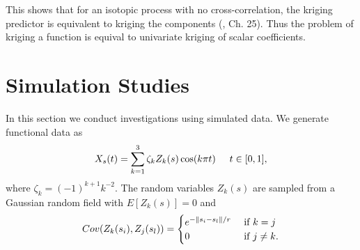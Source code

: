 This shows that for an isotopic process with no cross-correlation, the kriging predictor is equivalent to kriging the components (\cite{wackernagel2003multivariate}, Ch. 25). Thus the problem of kriging a function is equival to univariate kriging of scalar coefficients. 

	



\section{Simulation Studies} 

\label{sec:numerical_experiments}

In this section we conduct investigations using simulated data. We generate functional data as
\begin{equation}
	X_s(t) = \sum^{3}_{k=1}\zeta_k Z_k(s) \cos(k\pi t) \hspace{0.5cm} t \in [0,1], 
	\label{eq:sim process2} 
\end{equation}
where \(\zeta_k=(-1)^{k+1}k^{-2}\). The random variables $Z_k(s)$ are sampled from a Gaussian random field with $E[Z_k(s)]=0$ and 
\begin{equation}
	Cov(Z_k(s_i), Z_j(s_l)) = \begin{cases} 
																e^{-\left\|s_i - s_l\right\|/r} &\mbox{ if } k = j\\
																0 & \mbox{ if } j \neq k.
															\end{cases}
	\label{eq:exp cov}
\end{equation} 


